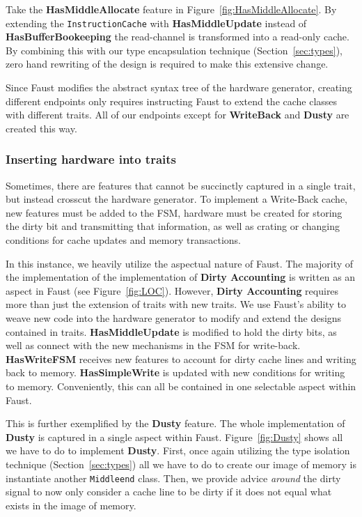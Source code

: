 \documentclass[conference]{IEEEtran}
\begin{document}
Take the \textbf{HasMiddleAllocate} feature in Figure~\ref{fig:HasMiddleAllocate}. By extending the \texttt{InstructionCache} with \textbf{HasMiddleUpdate} instead of \textbf{HasBufferBookeeping} the read-channel is transformed into a read-only cache. By combining this with our type encapsulation technique (Section~\ref{sec:types}), zero hand rewriting of the design is required to make this extensive change.

Since Faust modifies the abstract syntax tree of the hardware generator, creating different endpoints only requires instructing Faust to extend the cache classes with different traits. All of our endpoints except for \textbf{WriteBack} and \textbf{Dusty} are created this way.

\subsubsection{Inserting hardware into traits}
Sometimes, there are features that cannot be succinctly captured in a single trait, but instead crosscut the hardware generator. To implement a Write-Back cache, new features must be added to the FSM, hardware must be created for storing the dirty bit and transmitting that information, as well as crating or changing conditions for cache updates and memory transactions. 

In this instance, we heavily utilize the aspectual nature of Faust. The majority of the implementation of the implementation of \textbf{Dirty Accounting} is written as an aspect in Faust (see Figure~\ref{fig:LOC}). However, \textbf{Dirty Accounting} requires more than just the extension of traits with new traits. We use Faust's ability to weave new code into the hardware generator to modify and extend the designs contained in traits. \textbf{HasMiddleUpdate} is modified to hold the dirty bits, as well as connect with the new mechanisms in the FSM for write-back. \textbf{HasWriteFSM} receives new features to account for dirty cache lines and writing back to memory. \textbf{HasSimpleWrite} is updated with new conditions for writing to memory. Conveniently, this can all be contained in one selectable aspect within Faust.

This is further exemplified by the \textbf{Dusty} feature. The whole implementation of \textbf{Dusty} is captured in a single aspect within Faust. Figure~\ref{fig:Dusty} shows all we have to do to implement \textbf{Dusty}. First, once again utilizing the type isolation technique (Section~\ref{sec:types}) all we have to do to create our image of memory is instantiate another \texttt{Middleend} class. Then, we provide advice \emph{around} the dirty signal to now only consider a cache line to be dirty if it does not equal what exists in the image of memory.
\end{document}
